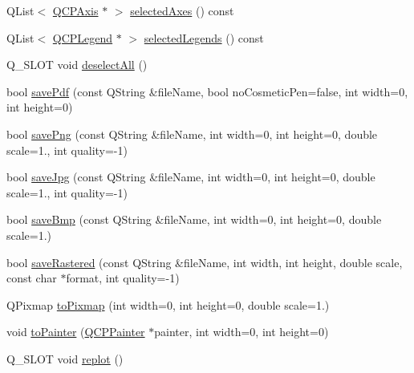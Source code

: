 \begin{DoxyCompactItemize}
\item 
Q\-List$<$ \hyperlink{class_q_c_p_axis}{Q\-C\-P\-Axis} $\ast$ $>$ \hyperlink{class_q_custom_plot_aa6baf867e8beb96ed5bd471f83ece903}{selected\-Axes} () const 
\item 
Q\-List$<$ \hyperlink{class_q_c_p_legend}{Q\-C\-P\-Legend} $\ast$ $>$ \hyperlink{class_q_custom_plot_a1ea6297300c3e2770e65f95836411755}{selected\-Legends} () const 
\item 
Q\-\_\-\-S\-L\-O\-T void \hyperlink{class_q_custom_plot_a9d4808ab925b003054085246c92a257c}{deselect\-All} ()
\item 
bool \hyperlink{class_q_custom_plot_a84e33ad7492180f20ff520e557ed102d}{save\-Pdf} (const Q\-String \&file\-Name, bool no\-Cosmetic\-Pen=false, int width=0, int height=0)
\item 
bool \hyperlink{class_q_custom_plot_a7636261aff1f6d25c9da749ece3fc8b8}{save\-Png} (const Q\-String \&file\-Name, int width=0, int height=0, double scale=1., int quality=-\/1)
\item 
bool \hyperlink{class_q_custom_plot_a490c722092d1771e8ce4a7a73dfd84ab}{save\-Jpg} (const Q\-String \&file\-Name, int width=0, int height=0, double scale=1., int quality=-\/1)
\item 
bool \hyperlink{class_q_custom_plot_a6629d9e8e6da4bf18055ee0257fdce9a}{save\-Bmp} (const Q\-String \&file\-Name, int width=0, int height=0, double scale=1.)
\item 
bool \hyperlink{class_q_custom_plot_ab528b84cf92baabe29b1d0ef2f77c93e}{save\-Rastered} (const Q\-String \&file\-Name, int width, int height, double scale, const char $\ast$format, int quality=-\/1)
\item 
Q\-Pixmap \hyperlink{class_q_custom_plot_aabb974d71ce96c137dc04eb6eab844fe}{to\-Pixmap} (int width=0, int height=0, double scale=1.)
\item 
void \hyperlink{class_q_custom_plot_a1be68d5c0f1e086d6374d1340a193fb9}{to\-Painter} (\hyperlink{class_q_c_p_painter}{Q\-C\-P\-Painter} $\ast$painter, int width=0, int height=0)
\item 
Q\-\_\-\-S\-L\-O\-T void \hyperlink{class_q_custom_plot_a563540b54b2a09c8ef092d42e9621f42}{replot} ()
\end{DoxyCompactItemize}
